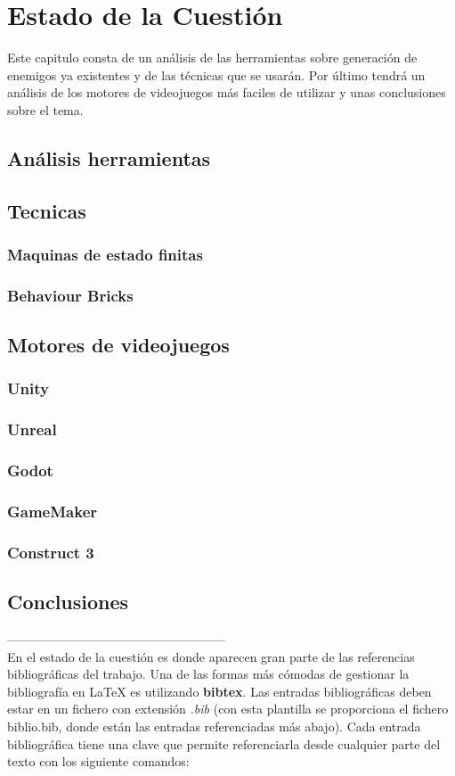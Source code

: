\chapter{Estado de la Cuestión}
\label{cap:estadoDeLaCuestion}
Este capitulo consta de un análisis de las herramientas sobre generación de enemigos ya existentes  y de las técnicas que se usarán. Por último tendrá un análisis de los motores de videojuegos más faciles de utilizar  y unas conclusiones sobre el tema. 
\section{Análisis herramientas}
\section{Tecnicas}
\subsection{Maquinas de estado finitas}
\subsection{Behaviour Bricks}
\section{Motores de videojuegos}
\subsection{Unity}
\subsection{Unreal}
\subsection{Godot}
\subsection{GameMaker}
\subsection{Construct 3}
\section{Conclusiones}
-----------------------------------------------------\\
En el estado de la cuestión es donde aparecen gran parte de las referencias bibliográficas del trabajo. Una de las formas más cómodas de gestionar la bibliografía en {\LaTeX} es utilizando \textbf{bibtex}. Las entradas bibliográficas deben estar en un fichero con extensión \textit{.bib} (con esta plantilla se proporciona el fichero biblio.bib, donde están las entradas referenciadas más abajo). Cada entrada bibliográfica tiene una clave que permite referenciarla desde cualquier parte del texto con los siguiente comandos:

